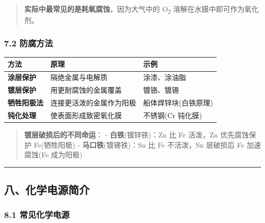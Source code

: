 \documentclass[a4paper,11pt]{ctexart}
\newcounter{none}
\newcommand{\箭}{\ensuremath{\rightarrow}}
\newcommand{\左箭}{\ensuremath{\leftarrow}}
\newcommand{\上箭}{\ensuremath{\uparrow}}
\newcommand{\下箭}{\ensuremath{\downarrow}}
\newcommand{\衡}{\ensuremath{\rightleftharpoons}}
\newcommand{\双箭}{\ensuremath{\leftrightarrow}}
\newcommand{\约等于}{\ensuremath{\approx}}
\newcommand{\小于等于}{\ensuremath{\leq}}
\newcommand{\大于等于}{\ensuremath{\geq}}
\newcommand{\不等于}{\ensuremath{\neq}}
\newcommand{\西格马}{\ensuremath{\sigma}}
\newcommand{\派}{\ensuremath{\pi}}
\begin{document}
\begin{quote}
\textbf{实际中最常见的是耗氧腐蚀}，因为大气中的 O\textsubscript{2} 溶解在水膜中即可作为氧化剂。
\end{quote}

\subsubsection{7.2 防腐方法}\label{ux9632ux8150ux65b9ux6cd5}

{\def\LTcaptype{none} %
\begin{longtable}[]{@{}lll@{}}
\toprule\noalign{}
方法 & 原理 & 示例 \\
\midrule\noalign{}
\endhead
\bottomrule\noalign{}
\endlastfoot
\textbf{涂层保护} & 隔绝金属与电解质 & 涂漆、涂油脂 \\
\textbf{镀层保护} & 用更耐腐蚀的金属覆盖 & 镀铬、镀锡 \\
\textbf{牺牲阳极法} & 连接更活泼的金属作为阳极 & 船体焊锌块(白铁原理) \\
\textbf{钝化处理} & 使表面形成致密氧化膜 & 不锈钢(Cr 钝化膜) \\
\end{longtable}
}

\begin{quote}
\textbf{镀层破损后的不同命运}：
- \textbf{白铁}(镀锌铁)：Zn 比 Fe 活泼，Zn 优先腐蚀保护 Fe(牺牲阳极)
- \textbf{马口铁}(镀锡铁)：Sn 比 Fe 不活泼，Sn 层破损后 Fe 加速腐蚀(Fe 成为阳极)
\end{quote}

\begin{center}\rule{0.5\linewidth}{0.5pt}\end{center}

\subsection{八、化学电源简介}\label{ux516bux5316ux5b66ux7535ux6e90ux7b80ux4ecb}

\subsubsection{8.1 常见化学电源}\label{ux5e38ux89c1ux5316ux5b66ux7535ux6e90}
\end{document}
